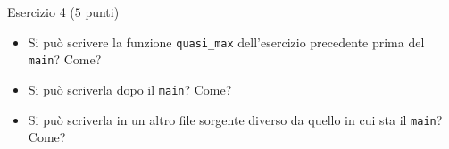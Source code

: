 \documentclass[12pt]{article}
\begin{document}
\vspace*{1ex}
\begin{center}{\Large Esercizio 4} ($5$ punti)\end{center}

\begin{itemize}
\item Si pu\`o scrivere la funzione \texttt{quasi\_max} dell'esercizio precedente
  prima del \texttt{main}? Come?
\item Si pu\`o scriverla dopo il \texttt{main}? Come?
\item Si pu\`o scriverla in un altro file sorgente diverso da quello
  in cui sta il \texttt{main}? Come?
\end{itemize}
\end{document}
